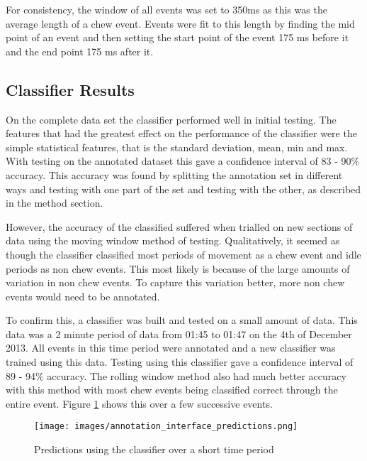 For consistency, the window of all events was set to 350ms as this was the average length of a chew event. Events were fit to this length by finding the mid point of an event and then setting the start point of the event 175 ms before it and the end point 175 ms after it. 

\subsection{Classifier Results}

On the complete data set the classifier performed well in initial testing. The features that had the greatest effect on the performance of the classifier were the simple statistical features, that is the standard deviation, mean, min and max. With testing on the annotated dataset this gave a confidence interval of 83 - 90\% accuracy. This accuracy was found by splitting the annotation set in different ways and testing with one part of the set and testing with the other, as described in the method section. 

However, the accuracy of the classified suffered when trialled on new sections of data using the moving window method of testing. Qualitatively, it seemed as though the classifier classified most periods of movement as a chew event and idle periods as non chew events. This most likely is because of the large amounts of variation in non chew events. To capture this variation better, more non chew events would need to be annotated.

To confirm this, a classifier was built and tested on a small amount of data. This data was a 2 minute period of data from 01:45 to 01:47 on the 4th of December 2013. All events in this time period were annotated and a new classifier was trained using this data. Testing using this classifier gave a confidence interval of 89 - 94\% accuracy. The rolling window method also had much better accuracy with this method with most chew events being classified correct through the entire event. Figure \ref{classifycorrect} shows this over a few successive events. 

\begin{figure}[ht!]
\begin{center}
\leavevmode
\texttt{[image: images/annotation\_interface\_predictions.png]}
\end{center}
\caption{Predictions using the classifier over a short time period}
\label{classifycorrect}
\end{figure}

